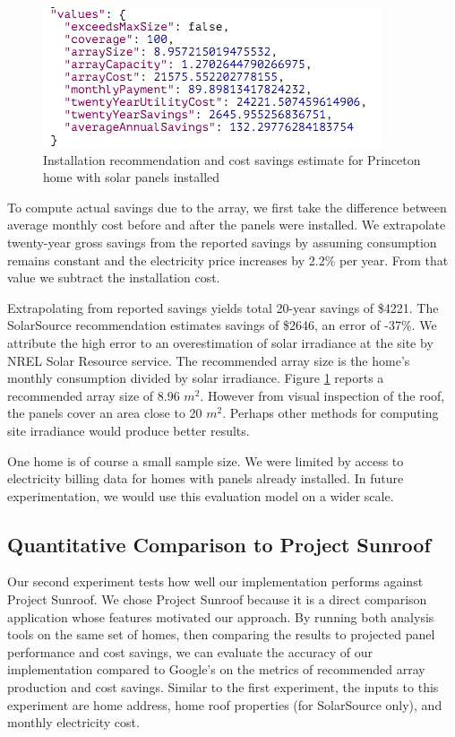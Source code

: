 \documentclass[pageno]{jpaper}
\begin{document}
\begin{figure}[h]
\begin{center}
\includegraphics[scale=0.7]{blejwas}
\caption{Installation recommendation and cost savings estimate for Princeton home with solar panels installed}
\label{fig:blejwas}
\end{center}
\end{figure}

To compute actual savings due to the array, we first take the difference between average monthly cost before and after the panels were installed. We extrapolate twenty-year gross savings from the reported savings by assuming consumption remains constant and the electricity price increases by 2.2\% per year. From that value we subtract the installation cost. 

Extrapolating from reported savings yields total 20-year savings of \$4221. The SolarSource recommendation estimates savings of \$2646, an error of -37\%. We attribute the high error to an overestimation of solar irradiance at the site by NREL Solar Resource service. The recommended array size is the home's monthly consumption divided by solar irradiance. Figure \ref{fig:blejwas} reports a recommended array size of 8.96 $m^2$. However from visual inspection of the roof, the panels cover an area close to 20 $m^2$. Perhaps other methods for computing site irradiance would produce better results.

One home is of course a small sample size. We were limited by access to electricity billing data for homes with panels already installed. In future experimentation, we would use this evaluation model on a wider scale. 

\subsection{Quantitative Comparison to Project Sunroof}

Our second experiment tests how well our implementation performs against Project Sunroof. We chose Project Sunroof because it is a direct comparison application whose features motivated our approach. By running both analysis tools on the same set of homes, then comparing the results to projected panel performance and cost savings, we can evaluate the accuracy of our implementation compared to Google's on the metrics of recommended array production and cost savings. Similar to the first experiment, the inputs to this experiment are home address, home roof properties (for SolarSource only), and monthly electricity cost.
\end{document}
